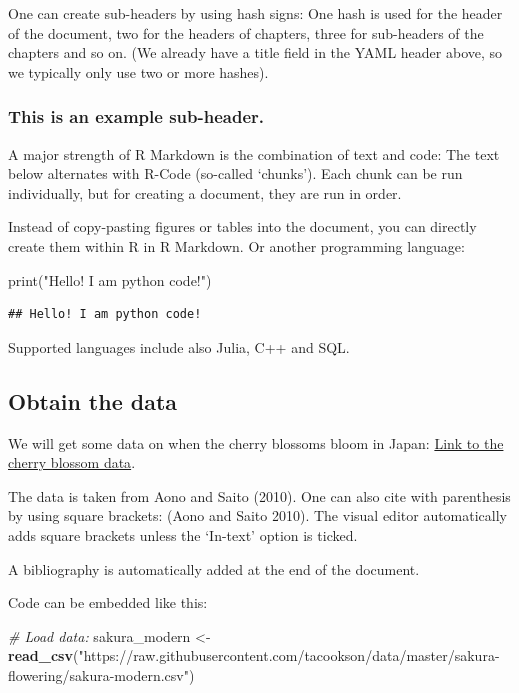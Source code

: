 \documentclass[
  12pt,
]{article}
\newenvironment{Shaded}{\begin{snugshade}}{\end{snugshade}}
\newcommand{\BuiltInTok}[1]{#1}
\newcommand{\CommentTok}[1]{\textcolor[rgb]{0.56,0.35,0.01}{\textit{#1}}}
\newcommand{\FunctionTok}[1]{\textcolor[rgb]{0.13,0.29,0.53}{\textbf{#1}}}
\newcommand{\NormalTok}[1]{#1}
\newcommand{\OtherTok}[1]{\textcolor[rgb]{0.56,0.35,0.01}{#1}}
\newcommand{\StringTok}[1]{\textcolor[rgb]{0.31,0.60,0.02}{#1}}
\begin{document}
One can create sub-headers by using hash signs: One hash is used for the
header of the document, two for the headers of chapters, three for
sub-headers of the chapters and so on. (We already have a title field in
the YAML header above, so we typically only use two or more hashes).

\subsubsection{This is an example
sub-header.}\label{this-is-an-example-sub-header.}

A major strength of R Markdown is the combination of text and code: The
text below alternates with R-Code (so-called `chunks'). Each chunk can
be run individually, but for creating a document, they are run in order.

Instead of copy-pasting figures or tables into the document, you can
directly create them within R in R Markdown. Or another programming
language:

\begin{Shaded}
\begin{Highlighting}[]
\BuiltInTok{print}\NormalTok{(}\StringTok{"Hello! I am python code!"}\NormalTok{)}
\end{Highlighting}
\end{Shaded}

\begin{verbatim}
## Hello! I am python code!
\end{verbatim}

Supported languages include also Julia, C++ and SQL.

\subsection{Obtain the data}\label{obtain-the-data}

We will get some data on when the cherry blossoms bloom in Japan:
\href{https://github.com/tacookson/data/tree/master/sakura-flowering}{Link
to the cherry blossom data}.

The data is taken from Aono and Saito (2010). One can also cite with
parenthesis by using square brackets: (Aono and Saito 2010). The visual
editor automatically adds square brackets unless the `In-text' option is
ticked.

A bibliography is automatically added at the end of the document.

Code can be embedded like this:

\begin{Shaded}
\begin{Highlighting}[]
\CommentTok{\# Load data:}
\NormalTok{sakura\_modern }\OtherTok{\textless{}{-}} \FunctionTok{read\_csv}\NormalTok{(}\StringTok{"https://raw.githubusercontent.com/tacookson/data/master/sakura{-}flowering/sakura{-}modern.csv"}\NormalTok{)}
\end{Highlighting}
\end{Shaded}
\end{document}

